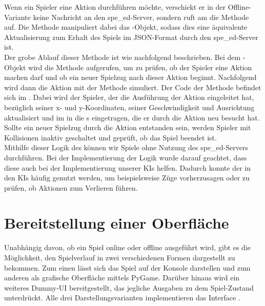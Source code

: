 Wenn ein Spieler eine Aktion durchführen möchte, verschickt er in der Offline-Variante keine Nachricht an den spe\_ed-Server,
sondern ruft am  die Methode  auf.
Die Methode manipuliert dabei das -Objekt, sodass dies eine äquivalente Aktualisierung zum Erhalt des Spiels
im JSON-Format durch den spe\_ed-Server ist. \\

Der grobe Ablauf dieser Methode ist wie nachfolgend beschrieben.
Bei dem -Objekt wird die Methode  aufgerufen, um zu prüfen, ob der Spieler eine
Aktion machen darf und ob ein neuer Spielzug nach dieser Aktion beginnt.
Nachfolgend wird dann die Aktion mit der Methode 
simuliert.
Der Code der Methode befindet sich im .
Dabei wird der Spieler, der die Ausführung der Aktion eingeleitet hat, bezüglich seiner x- und y-Koordinaten,
seiner Geschwindigkeit und Ausrichtung aktualisiert und im  in die s eingetragen,
die er durch die Aktion neu besucht hat.
Sollte ein neuer Spielzug durch die Aktion entstanden sein, werden Spieler mit Kollisionen inaktiv geschaltet und
geprüft, ob das Spiel beendet ist. \\

Mithilfe dieser Logik des  können wir Spiele ohne Nutzung des spe\_ed-Servers durchführen.
Bei der Implementierung der Logik wurde darauf geachtet, dass diese auch bei der Implementierung unserer \ac{KI}s
helfen.
Dadurch konnte der  in den \ac{KI}s häufig genutzt werden, um beispielsweise Züge vorherzusagen oder
zu prüfen, ob Aktionen zum Verlieren führen.

\section{Bereitstellung einer Oberfläche}
\label{sec:bereitstellung-oberflaeche}

Unabhängig davon, ob ein Spiel online oder offline ausgeführt wird, gibt es die Möglichkeit, den Spielverlauf in zwei
verschiedenen Formen dargestellt zu bekommen.
Zum einen lässt sich das Spiel auf der Konsole darstellen und zum anderen als grafische Oberfläche mittels PyGame.
Darüber hinaus wird ein weiteres Dummy-\ac{UI} bereitgestellt, das jegliche Ausgaben zu dem Spiel-Zustand unterdrückt.
Alle drei Darstellungsvarianten implementieren das Interface .

